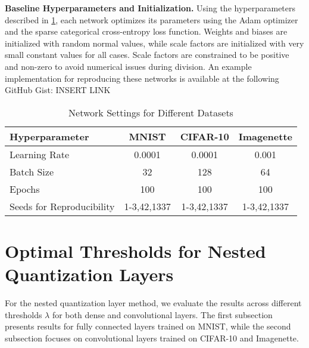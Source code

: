 \textbf{Baseline Hyperparameters and Initialization.} Using the hyperparameters described in \cref{tab:hyperparameters}, 
each network optimizes its parameters using the Adam optimizer and the sparse categorical cross-entropy loss function. 
Weights and biases are initialized with random normal values, 
while scale factors are initialized with very small constant values for all cases. 
Scale factors are constrained to be positive and non-zero to avoid numerical issues during division. 
An example implementation for reproducing these networks is available at the following GitHub Gist: INSERT LINK

\begin{table}[t!]
  \centering
  \caption{Network Settings for Different Datasets}
  \label{tab:hyperparameters}
  \begin{tabular}{lccc}
      \toprule
      \textbf{Hyperparameter}     & \textbf{MNIST} & \textbf{CIFAR-10} & \textbf{Imagenette} \\ 
      \midrule
      Learning Rate               & 0.0001            & 0.0001              & 0.001              \\ 
      Batch Size                  & 32                & 128                 & 64                 \\ 
      Epochs                      & 100               & 100                 & 100                \\ 
      Seeds for Reproducibility   & 1-3,42,1337     & 1-3,42,1337       & 1-3,42,1337                 \\ 
      \bottomrule
  \end{tabular}
\end{table}

\section{Optimal Thresholds for Nested Quantization Layers}
\label{sec:paretofronts}
\hspace*{1em}For the nested quantization layer method, we evaluate the results across different thresholds \( \lambda \)
for both dense and convolutional layers. The first subsection presents results for fully connected layers trained on MNIST,
while the second subsection focuses on convolutional layers trained on CIFAR-10 and Imagenette.

